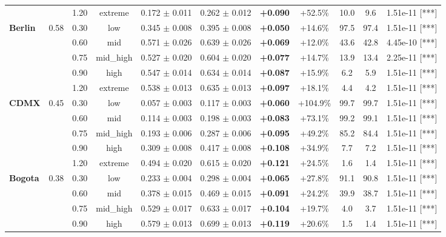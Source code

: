 \begin{table}[t]
{\begin{tabular}{llccccccccl}
   &  & 1.20 & extreme & 0.172 $\pm$ 0.011 & 0.262 $\pm$ 0.012 & \textbf{+0.090} & +52.5\% & 10.0 & 9.6 & 1.51e-11 [***] \\
\cmidrule(lr){1-11}
  \multirow{5}{*}{\textbf{Berlin}} & \multirow{5}{*}{0.58} & 0.30 & low & 0.345 $\pm$ 0.008 & 0.395 $\pm$ 0.008 & \textbf{+0.050} & +14.6\% & 97.5 & 97.4 & 1.51e-11 [***] \\
   &  & 0.60 & mid & 0.571 $\pm$ 0.026 & 0.639 $\pm$ 0.026 & \textbf{+0.069} & +12.0\% & 43.6 & 42.8 & 4.45e-10 [***] \\
   &  & 0.75 & mid\_high & 0.527 $\pm$ 0.020 & 0.604 $\pm$ 0.020 & \textbf{+0.077} & +14.7\% & 13.9 & 13.4 & 2.25e-11 [***] \\
   &  & 0.90 & high & 0.547 $\pm$ 0.014 & 0.634 $\pm$ 0.014 & \textbf{+0.087} & +15.9\% & 6.2 & 5.9 & 1.51e-11 [***] \\
   &  & 1.20 & extreme & 0.538 $\pm$ 0.013 & 0.635 $\pm$ 0.013 & \textbf{+0.097} & +18.1\% & 4.4 & 4.2 & 1.51e-11 [***] \\
\cmidrule(lr){1-11}
  \multirow{5}{*}{\textbf{CDMX}} & \multirow{5}{*}{0.45} & 0.30 & low & 0.057 $\pm$ 0.003 & 0.117 $\pm$ 0.003 & \textbf{+0.060} & +104.9\% & 99.7 & 99.7 & 1.51e-11 [***] \\
   &  & 0.60 & mid & 0.114 $\pm$ 0.003 & 0.198 $\pm$ 0.003 & \textbf{+0.083} & +73.1\% & 99.2 & 99.1 & 1.51e-11 [***] \\
   &  & 0.75 & mid\_high & 0.193 $\pm$ 0.006 & 0.287 $\pm$ 0.006 & \textbf{+0.095} & +49.2\% & 85.2 & 84.4 & 1.51e-11 [***] \\
   &  & 0.90 & high & 0.309 $\pm$ 0.008 & 0.417 $\pm$ 0.008 & \textbf{+0.108} & +34.9\% & 7.7 & 7.2 & 1.51e-11 [***] \\
   &  & 1.20 & extreme & 0.494 $\pm$ 0.020 & 0.615 $\pm$ 0.020 & \textbf{+0.121} & +24.5\% & 1.6 & 1.4 & 1.51e-11 [***] \\
\cmidrule(lr){1-11}
  \multirow{5}{*}{\textbf{Bogota}} & \multirow{5}{*}{0.38} & 0.30 & low & 0.233 $\pm$ 0.004 & 0.298 $\pm$ 0.004 & \textbf{+0.065} & +27.8\% & 91.1 & 90.8 & 1.51e-11 [***] \\
   &  & 0.60 & mid & 0.378 $\pm$ 0.015 & 0.469 $\pm$ 0.015 & \textbf{+0.091} & +24.2\% & 39.9 & 38.7 & 1.51e-11 [***] \\
   &  & 0.75 & mid\_high & 0.529 $\pm$ 0.017 & 0.633 $\pm$ 0.017 & \textbf{+0.104} & +19.7\% & 4.0 & 3.7 & 1.51e-11 [***] \\
   &  & 0.90 & high & 0.579 $\pm$ 0.013 & 0.699 $\pm$ 0.013 & \textbf{+0.119} & +20.6\% & 1.5 & 1.4 & 1.51e-11 [***] \\

\end{tabular}}
\end{table}
